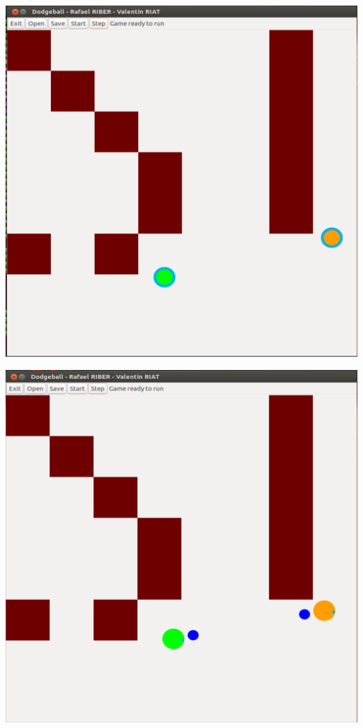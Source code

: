 \documentclass[a4paper, 11pt]{article}
\begin{document}
\begin{minipage}{0.33333333\textwidth}
\includegraphics[width=\textwidth]{figures/sim6.PNG}
\end{minipage}
\begin{minipage}{0.33333333\textwidth}
\includegraphics[width=\textwidth]{figures/sim7.PNG}
\end{minipage}\\
\end{document}
